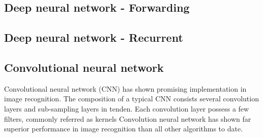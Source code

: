 \subsection{Deep neural network - Forwarding}
\subsection{Deep neural network - Recurrent}
\subsection{Convolutional neural network}
Convolutional neural network (CNN) has shown promising implementation in image recognition. The composition of a typical CNN consists several convolution layers and sub-sampling layers in tenden. Each convolution layer possess a few filters, commonly referred as kernels  
Convolution neural network has shown far superior performance in image recognition than all other algorithms to date.~\cite{Szegedy_2015}